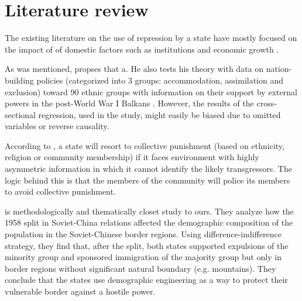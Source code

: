 \documentclass[11pt]{article}
\begin{document}







\section{Literature review}
The existing literature on the use of repression by a state have mostly focused on the impact of  of domestic factors such as institutions and economic growth \citep{davenport_state_2007, davenport_state_2007-1}.

As was mentioned, \citet{mylonas_politics_2013} propses that a. He also tests his theory with data on nation-building policies (categorized into 3 groups: accommodation, assimilation and exclusion)  toward  90 ethnic groups with information on their support by external powers in the post-World War I Balkans . However, the results of the cross-sectional regression, used in the study, might easily be biased due to omitted variables or reverse causality. 

According to \citet{blaydes_state_2018}, a state will resort to collective punishment (based on ethnicity, religion or community membership) if it faces environment with highly asymmetric information in which it cannot identify the likely transgressors. The logic behind this is that the members of the community will police its members to avoid collective punishment. 

\citet{mcnamee_demographic_nodate} is methodologically and thematically closet study to ours. They analyze how the 1958 split in Soviet-China relations affected the demographic composition of the population in the Soviet-Chinese border regions.
Using difference-indifference strategy, they find that, after the split,  both states supported expulsions  of the minority group and sponsored immigration of the majority group but only in border regions without significant natural boundary (e.g. mountains). They conclude that the states use demographic engineering as a way to protect their vulnerable border against a hostile power. 
\end{document}

